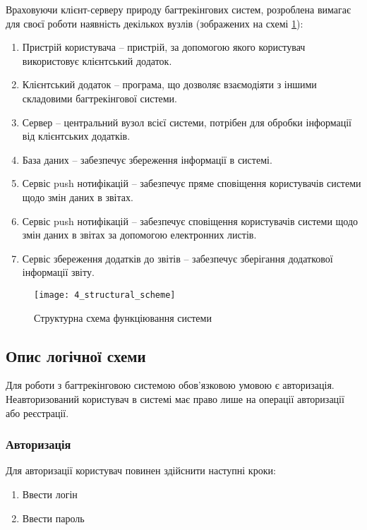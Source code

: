 \documentclass[../main.tex]{subfiles}
\begin{document}
Враховуючи клієнт-серверу природу багтрекінгових систем, розроблена вимагає для своєї роботи наявність декількох вузлів (зображених на схемі \ref{structural_scheme}):
\begin{enumerate}
	\item Пристрій користувача -- пристрій, за допомогою якого користувач використовує клієнтський додаток.
	\item Клієнтський додаток -- програма, що дозволяє взаємодіяти з іншими складовими багтрекінгової системи.
	\item Сервер -- центральний вузол всієї системи, потрібен для обробки інформації від клієнтських додатків.
	\item База даних -- забезпечує збереження інформації в системі.
	\item Сервіс push нотифікацій -- забезпечує пряме сповіщення користувачів системи щодо змін даних в звітах.
	\item Сервіс push нотифікацій -- забезпечує сповіщення користувачів системи щодо змін даних в звітах за допомогою електронних листів.
	\item Сервіс збереження додатків до звітів -- забезпечує зберігання додаткової інформації звіту.
\end{enumerate}

\begin{figure}[H]
	\centering
	\texttt{[image: 4\_structural\_scheme]}
	\caption{Структурна схема функціювання системи}
	\label{structural_scheme}
\end{figure}

\subsection{Опис логічної схеми}

Для роботи з багтрекінговою системою обов'язковою умовою є авторизація. Неавторизований користувач в системі має право лише на операції авторизації або реєстрації.

\subsubsection{Авторизація}
Для авторизації користувач повинен здійснити наступні кроки:
\begin{enumerate}
	\item Ввести логін
	\item Ввести пароль
\end{enumerate}
\end{document}
